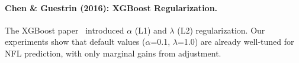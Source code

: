 \paragraph{Chen \& Guestrin (2016): XGBoost Regularization.}
The XGBoost paper~\cite{chen2016xgboost} introduced $\alpha$ (L1) and $\lambda$ (L2) regularization. Our experiments show that default values ($\alpha$=0.1, $\lambda$=1.0) are already well-tuned for NFL prediction, with only marginal gains from adjustment.
